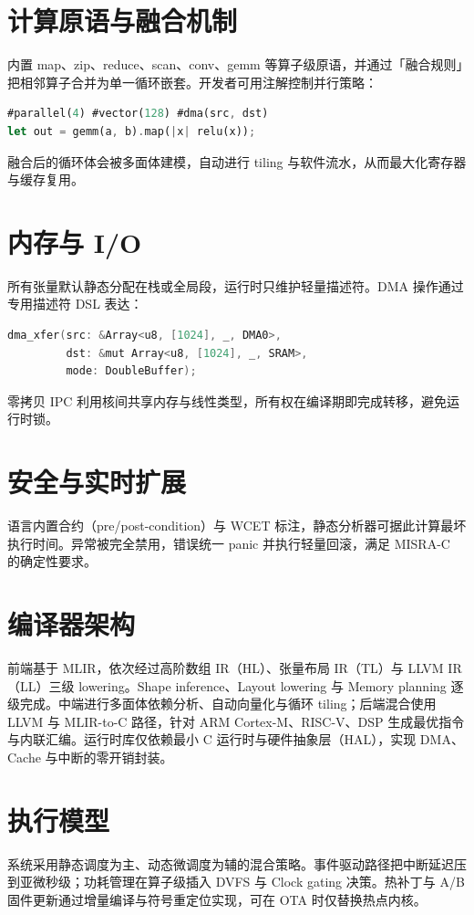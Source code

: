 \chapter{计算原语与融合机制}
内置 map、zip、reduce、scan、conv、gemm 等算子级原语，并通过「融合规则」把相邻算子合并为单一循环嵌套。开发者可用注解控制并行策略：\par
\begin{lstlisting}[language=rust]
#parallel(4) #vector(128) #dma(src, dst)
let out = gemm(a, b).map(|x| relu(x));
\end{lstlisting}
融合后的循环体会被多面体建模，自动进行 tiling 与软件流水，从而最大化寄存器与缓存复用。\par
\chapter{内存与 I/O}
所有张量默认静态分配在栈或全局段，运行时只维护轻量描述符。DMA 操作通过专用描述符 DSL 表达：\par
\begin{lstlisting}[language=c]
dma_xfer(src: &Array<u8, [1024], _, DMA0>,
         dst: &mut Array<u8, [1024], _, SRAM>,
         mode: DoubleBuffer);
\end{lstlisting}
零拷贝 IPC 利用核间共享内存与线性类型，所有权在编译期即完成转移，避免运行时锁。\par
\chapter{安全与实时扩展}
语言内置合约（pre/post-condition）与 WCET 标注，静态分析器可据此计算最坏执行时间。异常被完全禁用，错误统一 panic 并执行轻量回滚，满足 MISRA-C 的确定性要求。\par
\chapter{编译器架构}
前端基于 MLIR，依次经过高阶数组 IR（HL）、张量布局 IR（TL）与 LLVM IR（LL）三级 lowering。Shape inference、Layout lowering 与 Memory planning 逐级完成。中端进行多面体依赖分析、自动向量化与循环 tiling；后端混合使用 LLVM 与 MLIR-to-C 路径，针对 ARM Cortex-M、RISC-V、DSP 生成最优指令与内联汇编。运行时库仅依赖最小 C 运行时与硬件抽象层（HAL），实现 DMA、Cache 与中断的零开销封装。\par
\chapter{执行模型}
系统采用静态调度为主、动态微调度为辅的混合策略。事件驱动路径把中断延迟压到亚微秒级；功耗管理在算子级插入 DVFS 与 Clock gating 决策。热补丁与 A/B 固件更新通过增量编译与符号重定位实现，可在 OTA 时仅替换热点内核。\par
